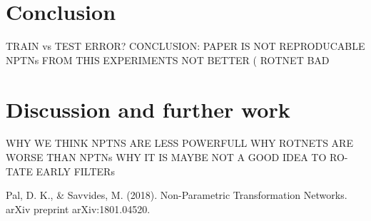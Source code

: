 \documentclass{llncs}
\begin{document}
\section{Conclusion}
TRAIN vs TEST ERROR?
CONCLUSION: PAPER IS NOT REPRODUCABLE NPTNs FROM THIS
EXPERIMENTS NOT BETTER ( ROTNET BAD
\section{Discussion and further work}
WHY WE THINK NPTNS ARE LESS POWERFULL WHY ROTNETS ARE
WORSE THAN NPTNs WHY IT IS MAYBE NOT A GOOD IDEA TO RO-
TATE EARLY FILTERs
%
%
\begin{thebibliography}{}
%
Pal, D. K., \& Savvides, M. (2018). Non-Parametric Transformation Networks. arXiv preprint arXiv:1801.04520.


%
%


\end{thebibliography}
%
\end{document}
